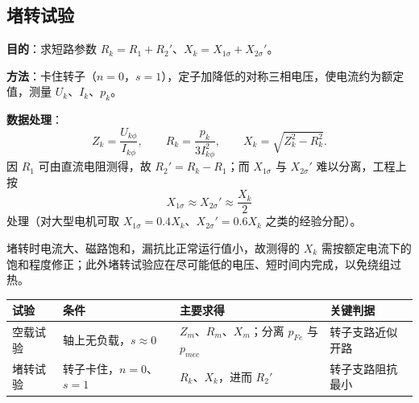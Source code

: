 \subsection{堵转试验}
\textbf{目的}：求短路参数 $R_k=R_1+R_2'$、$X_k=X_{1\sigma}+X_{2\sigma}'$。

\textbf{方法}：卡住转子（$n=0$，$s=1$），定子加降低的对称三相电压，使电流约为额定值，测量 $U_k$、$I_k$、$p_k$。

\textbf{数据处理}：
\begin{equation}
Z_k=\frac{U_{k\phi}}{I_{k\phi}},\qquad
R_k=\frac{p_k}{3I_{k\phi}^{2}},\qquad
X_k=\sqrt{Z_k^{2}-R_k^{2}} .
\end{equation}
因 $R_1$ 可由直流电阻测得，故 $R_2'=R_k-R_1$；而 $X_{1\sigma}$ 与 $X_{2\sigma}'$ 难以分离，工程上按
\begin{equation}
X_{1\sigma}\approx X_{2\sigma}'\approx\frac{X_k}{2}
\end{equation}
处理（对大型电机可取 $X_{1\sigma}=0.4X_k$、$X_{2\sigma}'=0.6X_k$ 之类的经验分配）。

堵转时电流大、磁路饱和，漏抗比正常运行值小，故测得的 $X_k$ 需按额定电流下的饱和程度修正；此外堵转试验应在尽可能低的电压、短时间内完成，以免绕组过热。

\begin{center}
\begin{tabular}{@{}p{2.0cm}p{3.6cm}p{3.8cm}p{3.6cm}@{}}
\toprule
试验 & 条件 & 主要求得 & 关键判据 \\
\midrule
空载试验 & 轴上无负载，$s\approx0$ & $Z_m$、$R_m$、$X_m$；分离 $p_{Fe}$ 与 $p_{mec}$ & 转子支路近似开路 \\
堵转试验 & 转子卡住，$n=0$、$s=1$ & $R_k$、$X_k$，进而 $R_2'$ & 转子支路阻抗最小 \\
\bottomrule
\end{tabular}
\end{center}

